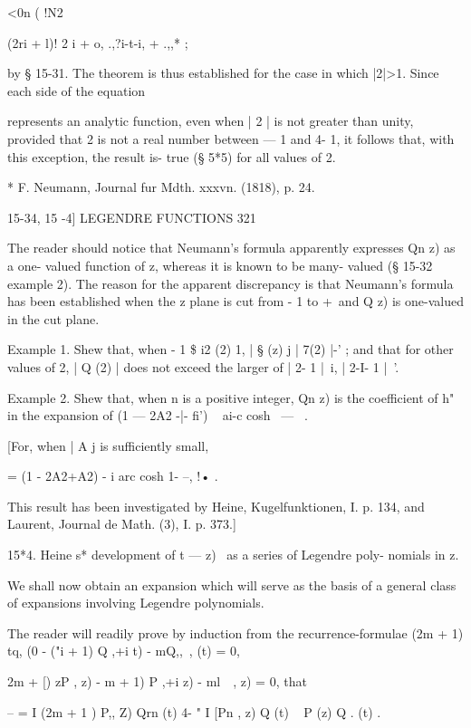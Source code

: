 {{{<0n (  !N2 

(2ri + l)!  2 i + o, .,?i-t-i,   + .,,* ; 



by § 15-31. The theorem is thus established for the case in which |2|>1. Since each 
side of the equation 

represents an analytic function, even when | 2 | is not greater than unity, provided that 2 is 
not a real number between — 1 and 4- 1, it follows that, with this exception, the result is- 
true (§ 5*5) for all values of 2. 

* F. Neumann, Journal fur Mdth. xxxvn. (1818), p. 24. 



15-34, 15 -4] LEGENDRE FUNCTIONS 321 

The reader should notice that Neumann's formula apparently expresses Qn z) as a 
one- valued function of z, whereas it is known to be many- valued (§ 15-32 example 2). 
The reason for the apparent discrepancy is that Neumann's formula has been established 
when the z plane is cut from - 1 to +\, and Q   z) is one-valued in the cut plane. 

Example 1. Shew that, when - 1 \$ i2 (2)   1, | §  (z) j   | 7(2) |-' ; and that for other 
values of 2, | Q  (2) | does not exceed the larger of | 2- 1 |~i, | 2-I- 1 |~'. 

Example 2. Shew that, when n is a positive integer, Qn z) is the coefficient of h" in 
the expansion of (1 — 2A2 -|- fi') ~   ai-c cosh \ — \ . 

[For, when | A j is sufficiently small, 

= (1 - 2A2+A2) - i arc cosh 1- --, !• . 

This result has been investigated by Heine, Kugelfunktionen, I. p. 134, and Laurent, 
Journal de Math. (3), I. p. 373.] 

15*4. Heine s* development of  t — z)~  as a series of Legendre poly- 
nomials in z. 

We shall now obtain an expansion which will serve as the basis of 
a general class of expansions involving Legendre polynomials. 

The reader will readily prove by induction from the recurrence-formulae 
(2m + 1) tq,  (0 - ("i + 1) Q ,+i  t) - mQ,,\ , (t) = 0, 

 2m + [) zP ,  z) -  m + 1) P ,+i  z) - ml\ \  ,  z) = 0, 
that 

-- = I (2m + 1 ) P,,  Z) Qrn (t) 4- "   I [Pn ,  z) Q  (t) ~ P  (z) Q  . (t) . 

}}}
